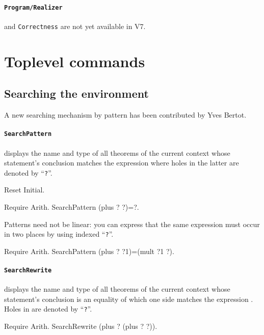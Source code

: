 \documentclass[11pt]{article}
\begin{document}
  \paragraph{{\tt Program/Realizer}} and {\tt Correctness} are not yet
  available in {\Coq} V7.

\section{Toplevel commands}

\subsection{Searching the environment}
\label{Search}
A new searching mechanism by pattern has been contributed by Yves Bertot.


\paragraph{{\tt SearchPattern {\term}}}
displays the name and type of all theorems of the current
context whose statement's conclusion matches the expression {\term}
where holes in the latter are denoted by ``{\tt ?}''.

\begin{coq_eval}
Reset Initial.
\end{coq_eval}
\begin{coq_example}
Require Arith.
SearchPattern (plus ? ?)=?.
\end{coq_example}

Patterns need not be linear: you can express that the same
expression must occur in two places by using indexed ``{\tt ?}''.

\begin{coq_example}
Require Arith.
SearchPattern (plus ? ?1)=(mult ?1 ?).
\end{coq_example}

\paragraph{{\tt SearchRewrite {\term}}}
displays the name and type of all theorems of the current
context whose statement's conclusion is an equality of which one side matches
the expression {\term}. Holes in {\term} are denoted by ``{\tt ?}''.

\begin{coq_example}
Require Arith.
SearchRewrite (plus ? (plus ? ?)).
\end{coq_example}
\end{document}
